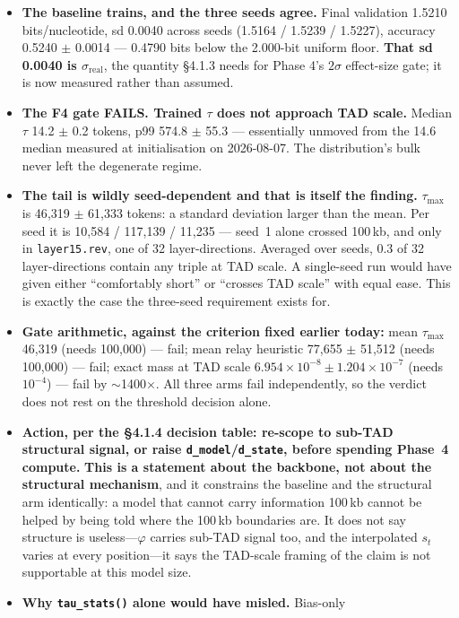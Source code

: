 \documentclass[11pt,a4paper]{article}
\newcommand{\code}[1]{\texttt{\small #1}}
\newcommand{\warn}[1]{\textcolor{warncol}{\textbf{#1}}}
\begin{document}
\begin{itemize}
\item \textbf{The baseline trains, and the three seeds agree.} Final validation
1.5210 bits/nucleotide, sd 0.0040 across seeds (1.5164 / 1.5239 / 1.5227),
accuracy 0.5240 $\pm$ 0.0014 --- 0.4790 bits below the 2.000-bit uniform floor.
\textbf{That sd 0.0040 is $\sigma_{\text{real}}$}, the quantity \S4.1.3 needs
for Phase 4's $2\sigma$ effect-size gate; it is now measured rather than
assumed.
\item \warn{The F4 gate FAILS. Trained $\tau$ does not approach TAD scale.}
Median $\tau$ 14.2 $\pm$ 0.2 tokens, p99 574.8 $\pm$ 55.3 --- essentially
unmoved from the 14.6 median measured at initialisation on 2026-08-07. The
distribution's bulk never left the degenerate regime.
\item \textbf{The tail is wildly seed-dependent and that is itself the finding.}
$\tau_{\max}$ is 46{,}319 $\pm$ 61{,}333 tokens: a standard deviation larger
than the mean. Per seed it is 10{,}584 / 117{,}139 / 11{,}235 --- seed~1 alone
crossed 100\,kb, and only in \code{layer15.rev}, one of 32 layer-directions.
Averaged over seeds, 0.3 of 32 layer-directions contain any triple at TAD
scale. A single-seed run would have given either ``comfortably short'' or
``crosses TAD scale'' with equal ease. This is exactly the case the three-seed
requirement exists for.
\item \textbf{Gate arithmetic, against the criterion fixed earlier today:} mean
$\tau_{\max}$ 46{,}319 (needs 100{,}000) --- fail; mean relay heuristic 77{,}655
$\pm$ 51{,}512 (needs 100{,}000) --- fail; exact mass at TAD scale
$6.954\times10^{-8} \pm 1.204\times10^{-7}$ (needs $10^{-4}$) --- fail by
$\sim$1400$\times$. All three arms fail independently, so the verdict does not
rest on the threshold decision alone.
\item \textbf{Action, per the \S4.1.4 decision table: re-scope to sub-TAD
structural signal, or raise \code{d\_model}/\code{d\_state}, before spending
Phase~4 compute.} \warn{This is a statement about the backbone, not about the
structural mechanism}, and it constrains the baseline and the structural arm
identically: a model that cannot carry information 100\,kb cannot be helped by
being told where the 100\,kb boundaries are. It does not say structure is
useless---$\varphi$ carries sub-TAD signal too, and the interpolated $s_t$
varies at every position---it says the TAD-scale framing of the claim is not
supportable at this model size.
\item \textbf{Why \code{tau\_stats()} alone would have misled.} Bias-only

\end{itemize}
\end{document}
